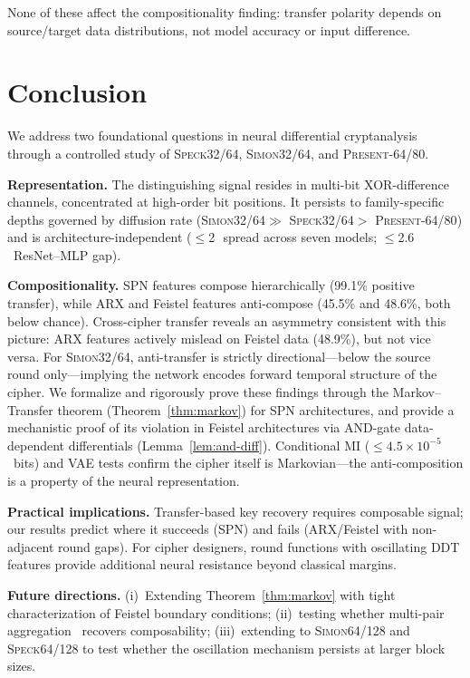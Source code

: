 \documentclass[runningheads]{llncs}
\newcommand{\speck}{\textsc{Speck32/64}\xspace}
\newcommand{\simon}{\textsc{Simon32/64}\xspace}
\newcommand{\present}{\textsc{Present-64/80}\xspace}
\newcommand{\pp}{\,\text{pp}}  %
\begin{document}
None of these affect the compositionality finding: transfer polarity depends on source/target data distributions, not model accuracy or input difference.


\section{Conclusion}
\label{sec:conclusion}

We address two foundational questions in neural differential cryptanalysis through a controlled study of \speck, \simon, and \present.

\textbf{Representation.}
The distinguishing signal resides in multi-bit XOR-difference channels, concentrated at high-order bit positions.
It persists to family-specific depths governed by diffusion rate (\simon $\gg$ \speck $>$ \present) and is architecture-independent ($\leq$2\pp\ spread across seven models; $\leq$2.6\pp\ ResNet--MLP gap).

\textbf{Compositionality.}
SPN features compose hierarchically (99.1\% positive transfer), while ARX and Feistel features anti-compose (45.5\% and 48.6\%, both below chance).
Cross-cipher transfer reveals an asymmetry consistent with this picture: ARX features actively mislead on Feistel data (48.9\%), but not vice versa.
For \simon, anti-transfer is strictly directional---below the source round only---implying the network encodes forward temporal structure of the cipher.
We formalize and rigorously prove these findings through the Markov--Transfer theorem (Theorem~\ref{thm:markov}) for SPN architectures, and provide a mechanistic proof of its violation in Feistel architectures via AND-gate data-dependent differentials (Lemma~\ref{lem:and-diff}).
Conditional MI ($\leq 4.5{\times}10^{-5}$~bits) and VAE tests confirm the cipher itself is Markovian---the anti-composition is a property of the neural representation.

\textbf{Practical implications.}
Transfer-based key recovery requires composable signal; our results predict where it succeeds (SPN) and fails (ARX/Feistel with non-adjacent round gaps).
For cipher designers, round functions with oscillating DDT features provide additional neural resistance beyond classical margins.

\textbf{Future directions.}
(i)~Extending Theorem~\ref{thm:markov} with tight characterization of Feistel boundary conditions;
(ii)~testing whether multi-pair aggregation~\cite{zhang2025multipair} recovers composability;
(iii)~extending to \textsc{Simon64/128} and \textsc{Speck64/128} to test whether the oscillation mechanism persists at larger block sizes.
\end{document}
